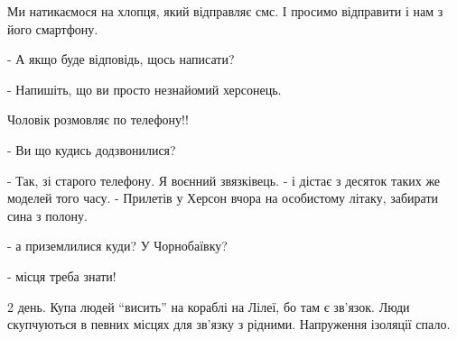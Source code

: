 Ми натикаємося на хлопця, який відправляє смс. І просимо відправити і нам з
його смартфону. 

- А якщо буде відповідь, щось написати?

- Напишіть, що ви просто незнайомий херсонець. 

Чоловік розмовляє по телефону!! 

- Ви що кудись додзвонилися?

- Так, зі старого телефону. Я воєнний звязківець. - і дістає з десяток таких же
моделей того часу. - Прилетів у Херсон вчора на особистому літаку, забирати
сина з полону. 

- а приземлилися куди? У Чорнобаївку?

- місця треба знати!

2 день. Купа людей \enquote{висить} на кораблі на Лілеї, бо там є зв'язок. Люди
скупчуються в певних місцях для зв'язку з рідними. Напруження ізоляції спало.

